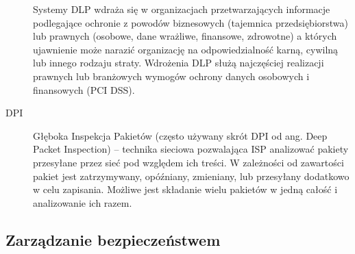 \documentclass[answers,11pt]{exam}
\begin{document}
\begin{questions}
\begin{solution}
\begin{description}
Systemy DLP wdraża się w organizacjach przetwarzających informacje podlegające ochronie z powodów biznesowych (tajemnica przedsiębiorstwa) lub prawnych (osobowe, dane wrażliwe, finansowe, zdrowotne) a których ujawnienie może narazić organizację na odpowiedzialność karną, cywilną lub innego rodzaju straty. Wdrożenia DLP służą najczęściej realizacji prawnych lub branżowych wymogów ochrony danych osobowych i finansowych (PCI DSS).
\item[DPI]
Głęboka Inspekcja Pakietów (często używany skrót DPI od ang. Deep Packet Inspection) – technika sieciowa pozwalająca ISP analizować pakiety przesyłane przez sieć pod względem ich treści. W zależności od zawartości pakiet jest zatrzymywany, opóźniany, zmieniany, lub przesyłany dodatkowo w celu zapisania. Możliwe jest składanie wielu pakietów w jedną całość i analizowanie ich razem.
\end{description}
\end{solution}
\end{questions}


\subsection{Zarządzanie bezpieczeństwem}
\end{document}
